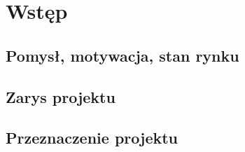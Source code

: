 \chapter{Wstęp}
\section{Pomysł, motywacja, stan rynku}
\section{Zarys projektu}
\section{Przeznaczenie projektu}